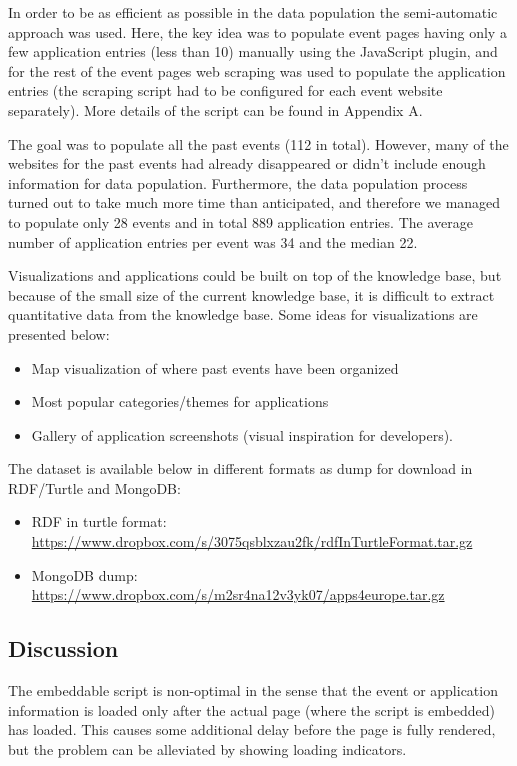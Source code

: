 In order to be as efficient as possible in the data population the semi-automatic approach was used. Here, the key idea was to populate event pages having only a few application entries (less than 10) manually using the JavaScript plugin, and for the rest of the event pages web scraping was used to populate the application entries (the scraping script had to be configured for each event website separately). More details of the script can be found in Appendix A.  

The goal was to populate all the past events (112 in total). However, many of the websites for the past events had already disappeared or didn't include enough information for data population. Furthermore, the data population process turned out to take much more time than anticipated, and therefore we managed to populate only 28 events and in total 889 application entries. The average number of application entries per event was 34 and the median 22.

Visualizations and applications could be built on top of the knowledge base, but because of the small size of the current knowledge base, it is difficult to extract quantitative data from the knowledge base. Some ideas for visualizations are presented below:
\begin{itemize}
\item Map visualization of where past events have been organized
\item Most popular categories/themes for applications
\item Gallery of application screenshots (visual inspiration for developers).
\end{itemize}


The dataset is available below in different formats as dump for download in RDF/Turtle and MongoDB:

\begin{itemize}
\item RDF in turtle format: \\
\url{https://www.dropbox.com/s/3075qsblxzau2fk/rdfInTurtleFormat.tar.gz} 
\item MongoDB dump: \url{https://www.dropbox.com/s/m2sr4na12v3yk07/apps4europe.tar.gz} 
\end{itemize}

\subsection{Discussion}
The embeddable script is non-optimal in the sense that the event or application information is loaded only after the actual page (where the script is embedded) has loaded. This causes some additional delay before the page is fully rendered, but the problem can be alleviated by showing loading indicators.

